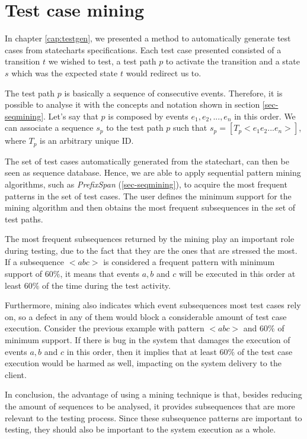 \section{Test case mining}
\label{sec-testsequence}

In chapter \ref{cap:testgen}, we presented a method to automatically generate test cases from statecharts specifications. Each test case presented consisted of a transition $t$ we wished to test, a test path $p$ to activate the transition and a state $s$ which was the expected state $t$ would redirect us to.

The test path $p$ is basically a sequence of consecutive events. Therefore, it is possible to analyse it with the concepts and notation shown in section \ref{sec-seqmining}. Let's say that $p$ is composed by events $e_1,e_2,...,e_n$ in this order. We can associate a sequence $s_p$ to the test path $p$ such that $s_p = [T_p < e_1e_2...e_n >]$, where $T_p$ is an arbitrary unique ID.


The set of test cases automatically generated from the statechart, can then be seen as sequence database. Hence, we are able to apply sequential pattern mining algorithms, such as \textit{PrefixSpan} (\ref{sec-seqmining}), to acquire the most frequent patterns in the set of test cases. The user defines the minimum support for the mining algorithm and then obtains the most frequent subsequences in the set of test paths.

The most frequent subsequences returned by the mining play an important role during testing, due to the fact that they are the ones that are stressed the most. If a subsequence $< a b c >$ is considered a frequent pattern with minimum support of $60\%$, it means that events $a, b$ and $c$ will be executed in this order at least $60\%$ of the time during the test activity.

Furthermore, mining also indicates which event subsequences most test cases rely on, so a defect in any of them would block a considerable amount of test case execution. Consider the previous example with pattern $< a b c >$ and $60\%$ of minimum support. If there is bug in the system that damages the execution of events $a, b$ and $c$ in this order, then it implies that at least $60\%$ of the test case execution would be harmed as well, impacting on the system delivery to the client.

In conclusion, the advantage of using a mining technique is that, besides reducing the amount of sequences to be analysed, it provides subsequences that are more relevant to the testing process. Since these subsequence patterns are important to testing, they should also be important to the system execution as a whole. 





